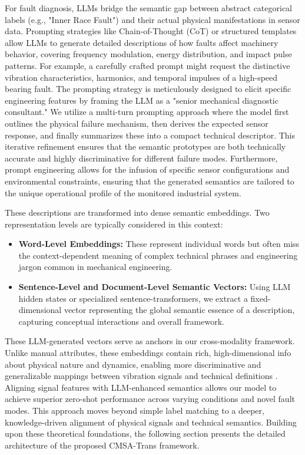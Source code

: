 \documentclass[journal]{IEEEtran}
\begin{document}
For fault diagnosis, LLMs bridge the semantic gap between abstract categorical labels (e.g., "Inner Race Fault") and their actual physical manifestations in sensor data. Prompting strategies like Chain-of-Thought (CoT) or structured templates allow LLMs to generate detailed descriptions of how faults affect machinery behavior, covering frequency modulation, energy distribution, and impact pulse patterns. For example, a carefully crafted prompt might request the distinctive vibration characteristics, harmonics, and temporal impulses of a high-speed bearing fault. The prompting strategy is meticulously designed to elicit specific engineering features by framing the LLM as a "senior mechanical diagnostic consultant." We utilize a multi-turn prompting approach where the model first outlines the physical failure mechanism, then derives the expected sensor response, and finally summarizes these into a compact technical descriptor. This iterative refinement ensures that the semantic prototypes are both technically accurate and highly discriminative for different failure modes. Furthermore, prompt engineering allows for the infusion of specific sensor configurations and environmental constraints, ensuring that the generated semantics are tailored to the unique operational profile of the monitored industrial system.

These descriptions are transformed into dense semantic embeddings. Two representation levels are typically considered in this context:
\begin{itemize}
    \item \textbf{Word-Level Embeddings:} These represent individual words but often miss the context-dependent meaning of complex technical phrases and engineering jargon common in mechanical engineering.
    \item \textbf{Sentence-Level and Document-Level Semantic Vectors:} Using LLM hidden states or specialized sentence-transformers, we extract a fixed-dimensional vector representing the global semantic essence of a description, capturing conceptual interactions and overall framework.
\end{itemize}
These LLM-generated vectors serve as anchors in our cross-modality framework. Unlike manual attributes, these embeddings contain rich, high-dimensional info about physical nature and dynamics, enabling more discriminative and generalizable mappings between vibration signals and technical definitions \cite{brown2020language, devlin2018bert, li2024industrial}. Aligning signal features with LLM-enhanced semantics allows our model to achieve superior zero-shot performance across varying conditions and novel fault modes. This approach moves beyond simple label matching to a deeper, knowledge-driven alignment of physical signals and technical semantics. Building upon these theoretical foundations, the following section presents the detailed architecture of the proposed CMSA-Trans framework.
\end{document}
